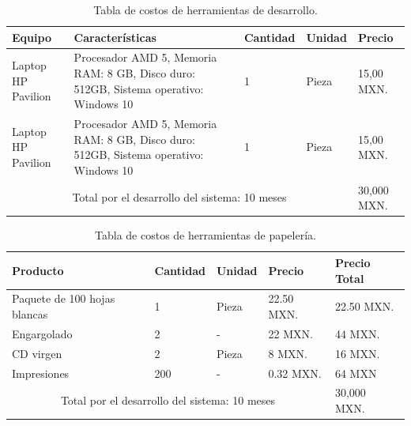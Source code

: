 	\begin{table}[htbp]
		\begin{center}
			\begin{tabular}{|p{20mm}|p{30mm}|p{15mm}|p{15mm}|p{15mm}|}
				\hline
				\textbf{Equipo} & \textbf{Características} & \textbf{Cantidad} & \textbf{Unidad} & \textbf{Precio}\\ \hline 
				Laptop HP Pavilion & Procesador AMD 5, Memoria RAM: 8 GB, Disco duro: 512GB, Sistema operativo: Windows 10  & 1 & Pieza & 15,00 MXN. \\ \hline
				
				Laptop HP Pavilion & Procesador AMD 5, Memoria RAM: 8 GB, Disco duro: 512GB, Sistema operativo: Windows 10  & 1 & Pieza & 15,00 MXN. \\ \hline
				
				\multicolumn{4}{|c|}{Total por el desarrollo del sistema: 10 meses} & 30,000 MXN.\\ \hline
			\end{tabular}
			\caption{Tabla de costos de herramientas de desarrollo.}
			\label{tablcostoherramientas}
		\end{center}
	\end{table}
	
	\begin{table}[htbp]
		\begin{center}
			\begin{tabular}{|p{20mm}|p{30mm}|p{15mm}|p{15mm}|p{15mm}|}
				\hline
				\textbf{Producto} & \textbf{Cantidad} & \textbf{Unidad} & \textbf{Precio}  & \textbf{Precio Total}\\ \hline 
				Paquete de 100 hojas blancas & 1  & Pieza & 22.50 MXN. & 22.50 MXN. \\ \hline
				
				Engargolado & 2 & - & 22 MXN. & 44 MXN. \\ \hline
				
				CD virgen & 2 & Pieza & 8 MXN. & 16 MXN. \\ \hline
				
				Impresiones & 200 & - & 0.32 MXN. & 64 MXN \\ \hline
				
				\multicolumn{4}{|c|}{Total por el desarrollo del sistema: 10 meses} & 30,000 MXN.\\ \hline
			\end{tabular}
			\caption{Tabla de costos de herramientas de papelería.}
			\label{tablacostospapeleria}
		\end{center}
	\end{table}
	
